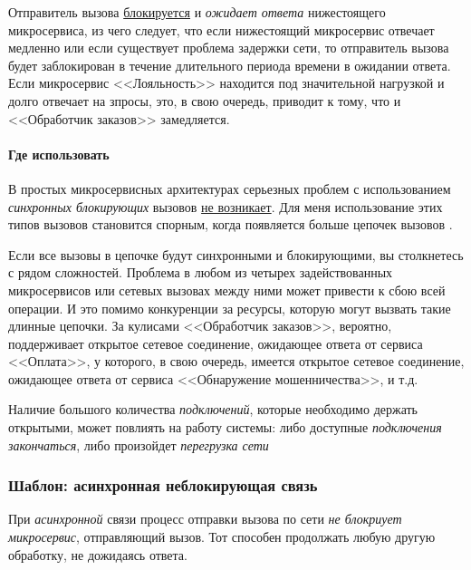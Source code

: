\documentclass[%
	11pt,
	a4paper,
	utf8,
		]{article}
\begin{document}
Отправитель вызова \underline{блокируется} и \emph{ожидает ответа} нижестоящего микросервиса, из чего следует, что если нижестоящий микросервис отвечает медленно или если существует проблема задержки сети, то отправитель вызова будет заблокирован в течение длительного периода времени в ожидании ответа. Если микросервис <<Лояльность>> находится под значительной нагрузкой и долго отвечает на зпросы, это, в свою очередь, приводит к тому, что и <<Обработчик заказов>> замедляется.

\paragraph{Где использовать}

В простых микросервисных архитектурах серьезных проблем с использованием \emph{синхронных блокирующих} вызовов \underline{не возникает}. Для меня использование этих типов вызовов становится спорным, когда появляется больше цепочек вызовов \cite[]{microservices-2024}.

Если все вызовы в цепочке будут синхронными и блокирующими, вы столкнетесь с рядом сложностей. Проблема в любом из четырех задействованных микросервисов или сетевых вызовах между ними может привести к сбою всей операции. И это помимо конкуренции за ресурсы, которую могут вызвать такие длинные цепочки. За кулисами <<Обработчик заказов>>, вероятно, поддерживает открытое сетевое соединение, ожидающее ответа от сервиса <<Оплата>>, у которого, в свою очередь, имеется открытое сетевое соединение, ожидающее ответа от сервиса <<Обнаружение мошенничества>>, и т.д.

{\color{red}Наличие большого количества \emph{подключений}, которые необходимо держать открытыми, может повлиять на работу системы: либо доступные \emph{подключения закончаться}, либо произойдет \emph{перегрузка сети}} \cite[]{microservices-2024} 

\subsubsection{Шаблон: асинхронная неблокирующая связь}

При \emph{асинхронной} связи процесс отправки вызова по сети \emph{не блокриует микросервис}, отправляющий вызов. Тот способен продолжать любую другую обработку, не дожидаясь ответа.
\end{document}
